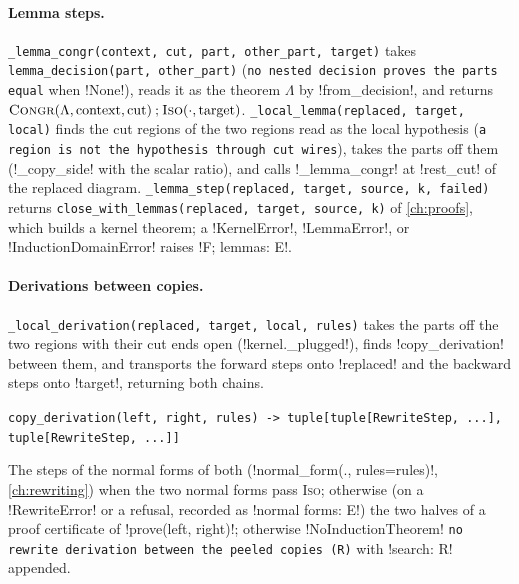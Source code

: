 \paragraph{Lemma steps.} \texttt{\_\allowbreak{}lemma\_\allowbreak{}congr(\allowbreak{}context,\allowbreak{} cut,\allowbreak{} part,\allowbreak{} other\_\allowbreak{}part,\allowbreak{} target)} takes \texttt{lemma\_\allowbreak{}decision(\allowbreak{}part,\allowbreak{} other\_\allowbreak{}part)} (\texttt{no nested decision proves the parts equal} when \py!None!), reads it as the theorem $\Lambda$ by \py!from_decision!, and returns $\textsc{Congr}(\Lambda,\text{context},\text{cut})\mathbin{;}\textsc{Iso}(\cdot,\text{target})$. \texttt{\_\allowbreak{}local\_\allowbreak{}lemma(\allowbreak{}replaced,\allowbreak{} target,\allowbreak{} local)} finds the cut regions of the two regions read as the local hypothesis (\texttt{a region is not the hypothesis through cut wires}), takes the parts off them (\py!_copy_side! with the scalar ratio), and calls \py!_lemma_congr! at \py!rest_cut! of the replaced diagram. \texttt{\_\allowbreak{}lemma\_\allowbreak{}step(\allowbreak{}replaced,\allowbreak{} target,\allowbreak{} source,\allowbreak{} k,\allowbreak{} failed)} returns \texttt{close\_\allowbreak{}with\_\allowbreak{}lemmas(\allowbreak{}replaced,\allowbreak{} target,\allowbreak{} source,\allowbreak{} k)} of \cref{ch:proofs}, which builds a kernel theorem; a \py!KernelError!, \py!LemmaError!, or \py!InductionDomainError! raises \code!F; lemmas: E!.

\paragraph{Derivations between copies.} \texttt{\_\allowbreak{}local\_\allowbreak{}derivation(\allowbreak{}replaced,\allowbreak{} target,\allowbreak{} local,\allowbreak{} rules)} takes the parts off the two regions with their cut ends open (\py!kernel._plugged!), finds \py!copy_derivation! between them, and transports the forward steps onto \code!replaced! and the backward steps onto \code!target!, returning both chains.

\begin{signature}
\texttt{copy\_\allowbreak{}derivation(\allowbreak{}left,\allowbreak{} right,\allowbreak{} rules) -> tuple[tuple[RewriteStep,\allowbreak{} .\allowbreak{}.\allowbreak{}.\allowbreak{}],\allowbreak{} tuple[RewriteStep,\allowbreak{} .\allowbreak{}.\allowbreak{}.\allowbreak{}]]}

The steps of the normal forms of both (\py!normal_form(., rules=rules)!, \cref{ch:rewriting}) when the two normal forms pass \textsc{Iso}; otherwise (on a \py!RewriteError! or a refusal, recorded as \code!normal forms: E!) the two halves of a proof certificate of \py!prove(left, right)!; otherwise \py!NoInductionTheorem! \texttt{no rewrite derivation between the peeled copies (\allowbreak{}R)} with \code!search: R! appended.
\end{signature}

